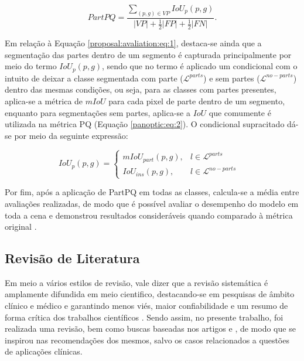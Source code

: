 \begin{equation}
\label{proposal:avaliation:eq:1}
    PartPQ = \frac{\sum _{(p,g) \in VP} IoU_p(p,g)}{|VP|+ \frac{1}{2}|FP| + \frac{1}{2}|FN|}.
\end{equation}

Em relação à Equação \ref{proposal:avaliation:eq:1}, destaca-se ainda que a segmentação das partes dentro de um segmento é capturada principalmente por meio do termo $IoU_p(p,g)$, sendo que no termo é aplicado um condicional com o intuito de deixar a classe segmentada com parte ($\mathcal{L}^{parts}$) e sem partes ($\mathcal{L}^{no-parts}$) dentro das mesmas condições, ou seja, para as classes com partes presentes, aplica-se a métrica de $mIoU$ para cada pixel de parte dentro de um segmento, enquanto para segmentações sem partes, aplica-se a $IoU$ que comumente é utilizada na métrica PQ (Equação \ref{panoptic:eq:2}). O condicional supracitado dá-se por meio da seguinte expressão:

\begin{equation}
\label{proposal:avaliation:eq:2}
    IoU_p(p,g)= \left\{\begin{matrix}
        mIoU_{part}(p,g), & l \in \mathcal{L}^{parts}    & \\ 
        IoU_{ins}(p,g),        & l \in \mathcal{L}^{no-parts} & 
    \end{matrix}\right.
\end{equation}

Por fim, após a aplicação de PartPQ em todas as classes, calcula-se a média entre avaliações realizadas, de modo que é possível avaliar o desempenho do modelo em toda a cena e demonstrou resultados consideráveis quando comparado à métrica original \cite{DeGeus2021}.


\subsection{Revisão de Literatura}
\label{proposal:revision}
Em meio a vários estilos de revisão, vale dizer que a revisão sistemática é amplamente difundida em meio cientifico, destacando-se em pesquisas de âmbito clínico e médico e garantindo menos viés, maior confiabilidade e um resumo de forma crítica dos trabalhos científicos \cite{barbosa2019}. Sendo assim, no presente trabalho, foi realizada uma revisão, bem como buscas baseadas nos artigos \cite{barbosa2019} e \cite{liberati2009}, de modo que se inspirou nas recomendações dos mesmos, salvo os casos relacionados a questões de aplicações clínicas.

